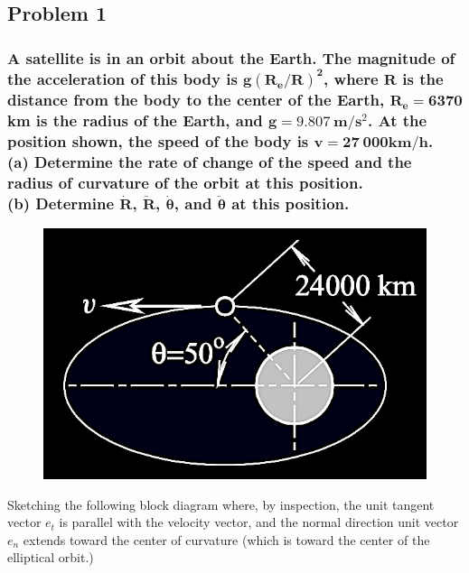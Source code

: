 \documentclass[12pt, letterpaper]{../assignment}
\begin{document}
\subsection*{Problem 1}
\subsubsection*{A satellite is in an orbit about the Earth.
The magnitude of the acceleration of this body is $\bm{g(R_e/R)^2}$,
where $\bm{R}$ is the distance from the body to  the center of the Earth,
$\bm{R_e = 6370}$ km is the radius of the Earth,
and $\bm{g = 9.807}\ \textbf{m}/\textbf{s}^2$.
At the position shown, the speed of the body is $\bm{v = 27\ 000 \textbf{km}/\textbf{h}}$.\\
(a) Determine the rate of change of the speed and the radius of curvature of the orbit at this position.\\
(b) Determine $\bm{\dot{R}}$, $\bm{\ddot{R}}$, $\bm{\dot{\theta}}$, and $\bm{\ddot{\theta}}$ at this position.}

\begin{figure}[H]
    \centering
    \includegraphics[scale=0.55,frame]{images/Problem_1.png}
\end{figure}

Sketching the following block diagram where, by inspection,
the unit tangent vector $e_t$ is parallel with the velocity vector,
and the normal direction unit vector $e_n$ extends toward the center of curvature
(which is toward the center of the elliptical orbit.)
\end{document}
